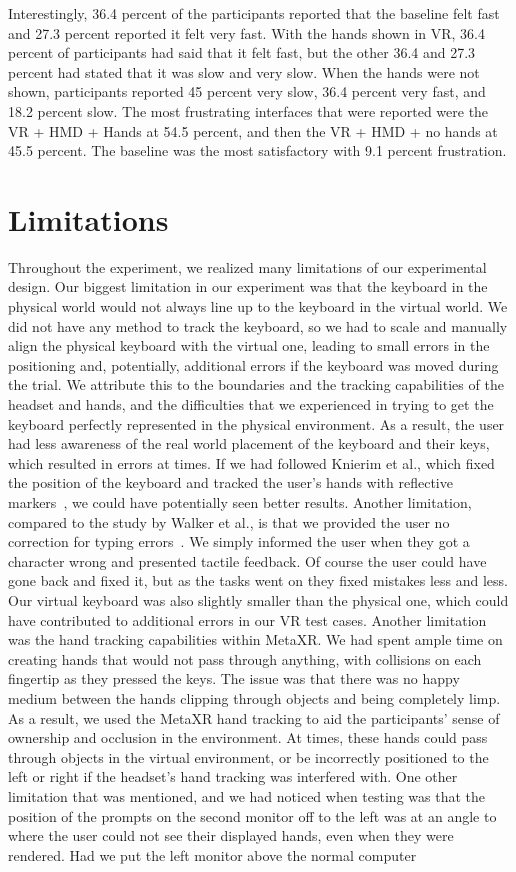 \documentclass[acmlarge]{acmart}
\begin{document}
Interestingly, 36.4 percent of the participants reported that the baseline felt fast and 27.3 percent reported it felt very fast. With the hands shown in VR, 36.4 percent of participants had said that it felt fast, but the other 36.4 and 27.3 percent had stated that it was slow and very slow. When the hands were not shown, participants reported 45 percent very slow, 36.4 percent very fast, and 18.2 percent slow. The most frustrating interfaces that were reported were the VR + HMD + Hands at 54.5 percent, and then the VR + HMD + no hands at 45.5 percent. The baseline was the most satisfactory with 9.1 percent frustration.


\section{Limitations}
Throughout the experiment, we realized many limitations of our experimental design. Our biggest limitation in our experiment was that the keyboard in the physical world would not always line up to the keyboard in the virtual world. We did not have any method to track the keyboard, so we had to scale and manually align the physical keyboard with the virtual one, leading to small errors in the positioning and, potentially, additional errors if the keyboard was moved during the trial. We attribute this to the boundaries and the tracking capabilities of the headset and hands, and the difficulties that we experienced in trying to get the keyboard perfectly represented in the physical environment. As a result, the user had less awareness of the real world placement of the keyboard and their keys, which resulted in errors at times. If we had followed Knierim et al., which fixed the position of the keyboard and tracked the user's hands with reflective markers~\cite{Knierim2018}, we could have potentially seen better results. Another limitation, compared to the study by Walker et al., is that we provided the user no correction for typing errors~\cite{Walker2017}. We simply informed the user when they got a character wrong and presented tactile feedback. Of course the user could have gone back and fixed it, but as the tasks went on they fixed mistakes less and less. Our virtual keyboard was also slightly smaller than the physical one, which could have contributed to additional errors in our VR test cases. Another limitation was the hand tracking capabilities within MetaXR. We had spent ample time on creating hands that would not pass through anything, with collisions on each fingertip as they pressed the keys. The issue was that there was no happy medium between the hands clipping through objects and being completely limp. As a result, we used the MetaXR hand tracking to aid the participants' sense of ownership and occlusion in the environment. At times, these hands could pass through objects in the virtual environment, or be incorrectly positioned to the left or right if the headset's hand tracking was interfered with. One other limitation that was mentioned, and we had noticed when testing was that the position of the prompts on the second monitor off to the left was at an angle to where the user could not see their displayed hands, even when they were rendered. Had we put the left monitor above the normal computer 
\end{document}

